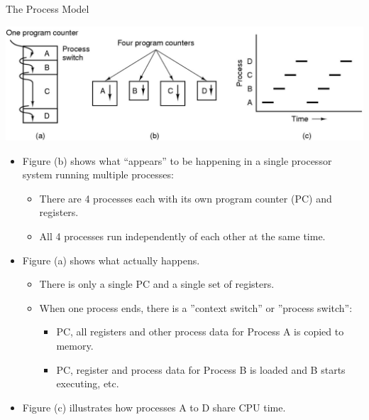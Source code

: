 \documentclass[11pt,a4paper]{article}
\theoremstyle{definition}
\newenvironment{myitemize}
{ \begin{itemize}
    \setlength{\itemsep}{5pt}
    \setlength{\parskip}{0pt}
    \setlength{\parsep}{0pt}     }
{ \end{itemize}                  }
\begin{document}
\begin{tcolorbox}
	\textsf{The Process Model}
	
	\includegraphics[scale=0.5]{m1/processModel}
	\centering
	
	\begin{myitemize}
		\item Figure (b) shows what “appears” to be happening in a single processor system running multiple processes:
		\begin{myitemize}
			\item There are 4 processes each with its own program counter (PC) and registers.
			\item All 4 processes run independently of each other at the same time.
		\end{myitemize}
		\item Figure (a) shows what actually happens.
		\begin{myitemize}
			\item There is only a single PC and a single set of registers.
			\item When one process ends, there is a ''context switch'' or ''process switch'':
			\begin{myitemize}
				\item PC, all registers and other process data for Process A is copied to memory.
				\item PC, register and process data for Process B is loaded and B starts executing, etc.
			\end{myitemize}
		\end{myitemize}
		\item Figure (c) illustrates how processes A to D share CPU time.
	\end{myitemize}
\end{tcolorbox}
\end{document}
